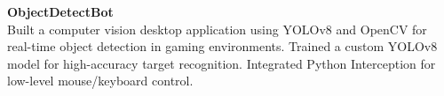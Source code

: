 \textbf{ObjectDetectBot}\\
Built a computer vision desktop application using YOLOv8 and OpenCV for real-time object detection in gaming environments. Trained a custom YOLOv8 model for high-accuracy target recognition. Integrated Python Interception for low-level mouse/keyboard control.
